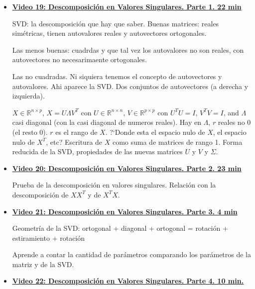 \documentclass[12pt,a4paper]{article}
\newcommand\1{\mbox{\,\vrule height-0.8pt depth1.0pt width2pc\,}}
\newcommand\2{\mbox{\,\vrule height-0.8pt depth1.0pt width1pc\,}}
\begin{document}
\begin{itemize}
    \item \href{https://youtu.be/0UtmPGTwLFw}{\bf Video 19:  Descomposición en Valores Singulares. Parte 1. 22 min}
    
    SVD: la descomposici\'on que hay que saber. Buenas matrices: reales simétricas, tienen autovalores reales y autovectores ortogonales.
    
    Las menos buenas: cuadrdas y que tal vez los autovalores no son reales, con autovectores no necesarimaente ortogonales.
    
    Las no cuadradas. Ni siquiera tenemos el concepto de autovectores y autovalores. Ahi aparece la SVD. Dos conjuntos de autovectores (a derecha y izquierda).
    
    $X\in {\mathbb R}^{n\times p}$, $X= U \Lambda V^T$ con $U\in \mathbb{R}^{n\times n}$, $V \in \mathbb{R}^{p\times p}$ con $U^T U=I$, $V^T V=I$, and $\Lambda $ casi diagonal (con la casi diagonal de numeros reales). Hay en $\Lambda $, $r  $ reales no 0 (el resto 0). $r $ es el rango de $X$. ?`Donde esta el espacio nulo de $X$, el espacio nulo de $X^T$, etc?
    Escritura de $X$ como suma de matrices de rango 1. Forma reducida de la SVD, propiedades de las nuevas matrices $U$ y $V$ y $\Sigma$.
    
    \item \href{https://youtu.be/Hn26OMADcnM}{\bf Video 20:  Descomposición en Valores Singulares. Parte 2. 23 min}   
    
    Prueba de la descomposici\'on en valores singulares. Relaci\'on con la descomposici\'on de $XX^T$ y de $X^T X$. 
    
    {\color{blue}{Al final del video hay preguntas que debemos contestar.}}
    
    \item \href{https://youtu.be/JRwlW0vrcF4}{\bf Video 21:  Descomposición en Valores Singulares. Parte 3. 4 min} 
    
    Geometr\'ia de la SVD: ortogonal $+$ diagonal $+ $ ortogonal = rotaci\'on $+$ estiramiento $+$ rotaci\'on
    
    
    Aprende a contar la cantidad de par\'ametros comparando los par\'ametros de la matriz y de la SVD.
    
    
     \item \href{https://youtu.be/YAZ1RrBcyzE}{\bf Video 22:  Descomposición en Valores Singulares. Parte 4. 10 min.} 
     
     
     

\end{itemize}
\end{document}
